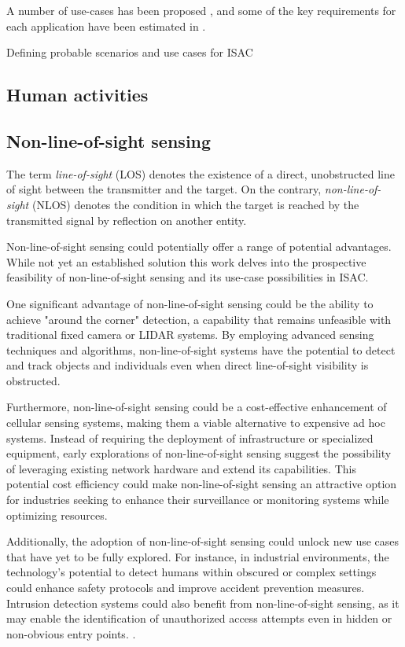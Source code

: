 	A number of use-cases has been proposed \cite{Mandelli_Henninger_Bauhofer_Wild_2023}, \cite{Wang_Varshney_Gentile_Blandino_Chuang_Golmie_2022} and some of the  key requirements for each application have been estimated in \cite{Wild_Braun_Viswanathan_2021}.
	
	Defining probable scenarios and use cases for ISAC 
	
	
	\subsection{Human activities}
	
	
	
	\subsection{Non-line-of-sight sensing}
	
	The term \textit{line-of-sight} (LOS)  denotes the existence of a direct, unobstructed line of sight between the transmitter and the target. On the contrary, \textit{non-line-of-sight} (NLOS) denotes the condition in which the target is reached by the transmitted signal by reflection on another entity.
	
	Non-line-of-sight sensing could potentially offer a range of potential advantages. While not yet an established solution this work delves into the prospective feasibility of non-line-of-sight sensing and its use-case possibilities in ISAC.
	
	One significant advantage of non-line-of-sight sensing could be the ability to achieve "around the corner" detection, a capability that remains unfeasible with traditional fixed camera or LIDAR systems. By employing advanced sensing techniques and algorithms, non-line-of-sight systems have the potential to detect and track objects and individuals even when direct line-of-sight visibility is obstructed.
	
	Furthermore, non-line-of-sight sensing could be a cost-effective enhancement of cellular sensing systems, making them a viable alternative to expensive ad hoc systems. Instead of requiring the deployment of infrastructure or specialized equipment, early explorations of non-line-of-sight sensing suggest the possibility of leveraging existing network hardware and extend its capabilities. This potential cost efficiency could make non-line-of-sight sensing an attractive option for industries seeking to enhance their surveillance or monitoring systems while optimizing resources.
	
	Additionally, the adoption of non-line-of-sight sensing could unlock new use cases that have yet to be fully explored. For instance, in industrial environments, the technology's potential to detect humans within obscured or complex settings could enhance safety protocols and improve accident prevention measures. Intrusion detection systems could also benefit from non-line-of-sight sensing, as it may enable the identification of unauthorized access attempts even in hidden or non-obvious entry points. 
	.
	

